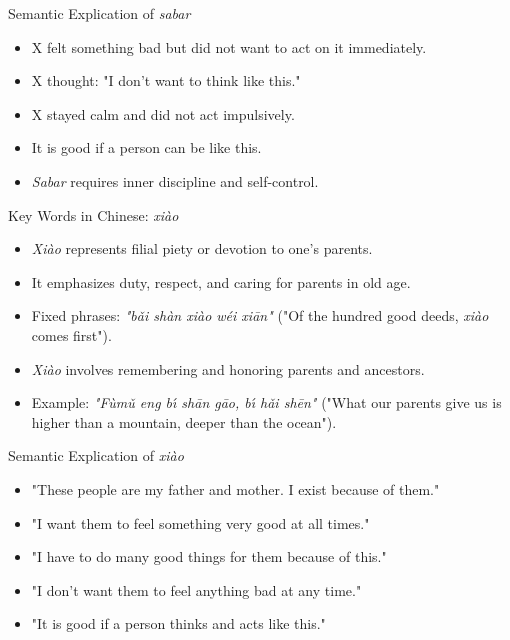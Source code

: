 \documentclass{beamer}
\begin{document}
\begin{frame}{Semantic Explication of \textit{sabar}}
    \begin{itemize}
        \item X felt something bad but did not want to act on it immediately.
        \item X thought: "I don’t want to think like this."
        \item X stayed calm and did not act impulsively.
        \item It is good if a person can be like this.
        \item \textit{Sabar} requires inner discipline and self-control.
    \end{itemize}
\end{frame}

\begin{frame}{Key Words in Chinese: \textit{xiào}}
    \begin{itemize}
        \item \textit{Xiào} represents filial piety or devotion to one’s parents.
        \item It emphasizes duty, respect, and caring for parents in old age.
        \item Fixed phrases: \textit{"bǎi shàn xiào wéi xiān"} ("Of the hundred good deeds, \textit{xiào} comes first").
        \item \textit{Xiào} involves remembering and honoring parents and ancestors.
        \item Example: \textit{"Fùmǔ eng bı́ shān gāo, bı́ hǎi shēn"} ("What our parents give us is higher than a mountain, deeper than the ocean").
    \end{itemize}
\end{frame}

\begin{frame}{Semantic Explication of \textit{xiào}}
    \begin{itemize}
        \item "These people are my father and mother. I exist because of them."
        \item "I want them to feel something very good at all times."
        \item "I have to do many good things for them because of this."
        \item "I don’t want them to feel anything bad at any time."
        \item "It is good if a person thinks and acts like this."
    \end{itemize}
\end{frame}
\end{document}
